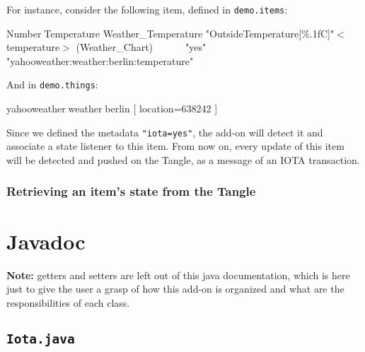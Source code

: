 \documentclass[a4paper,10pt]{article}
\begin{document}
\noindent For instance, consider the following item, defined in \texttt{demo.items}:

\begin{center}
\begin{tcolorbox}
\textcolor{TypeItem}{Number}\textcolor{white}{:}\textcolor{TypeItem}{Temperature} \textcolor{NameItem}{Weather\_Temperature} \textcolor{DescriptionItem}{"OutsideTemperature[\%.1f\degree C]"}\textcolor{GroupItem}{$<$temperature$>$} \textcolor{FuncItem}{(Weather\_Chart)} \textcolor{white}{\{iota=}\textcolor{DescriptionItem}{"yes"}\textcolor{white}{,} \textcolor{white}{channel=} \textcolor{DescriptionItem}{"yahooweather:weather:berlin:temperature"} \textcolor{white}{\}}
\end{tcolorbox}
\end{center}

\noindent And in \texttt{demo.things}:

\begin{center}
\begin{tcolorbox}
\textcolor{TypeItem}{yahooweather}\textcolor{white}{:}\textcolor{TypeItem}{weather}\textcolor{white}{:}\textcolor{NameItem}{berlin} \textcolor{GroupItem}{[ location=638242 ]}
\end{tcolorbox}
\end{center}

\noindent Since we defined the metadata \texttt{"iota=yes"}, the add-on will detect it and associate a state listener to this item. From now on, every update of this item will be detected and pushed on the Tangle, as a message of an IOTA transaction.

\subsubsection{Retrieving an item's state from the Tangle}   

\newpage 

\section{Javadoc}

\textbf{Note:} getters and setters are left out of this java documentation, which is here just to give the user a grasp of how this add-on is organized and what are the responsibilities of each class.

\subsection{\texttt{Iota.java}}
\end{document}
